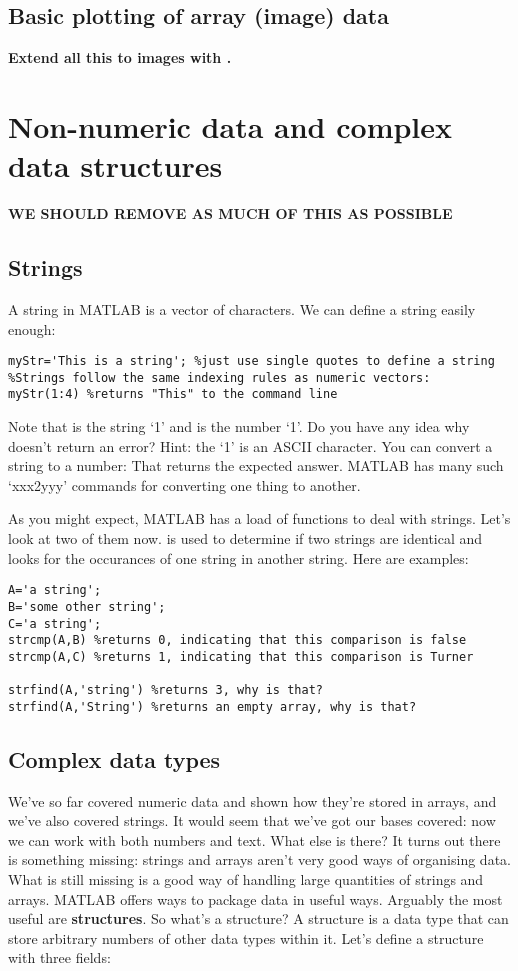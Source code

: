 \documentclass{article}
\begin{document}
\pagebreak
\subsection*{Basic plotting of array (image) data}
\textbf{Extend all this to images with .}



\pagebreak
\section*{Non-numeric data and complex data structures} 
\textbf{WE SHOULD REMOVE AS MUCH OF THIS AS POSSIBLE}

\subsection*{Strings}
A string in MATLAB is a vector of characters. We can define a string easily enough: 
\begin{lstlisting}
myStr='This is a string'; %just use single quotes to define a string
%Strings follow the same indexing rules as numeric vectors:
myStr(1:4) %returns "This" to the command line
\end{lstlisting}

Note that  is the string `1' and  is the number `1'. Do you have any idea why  doesn't return an error? Hint: the `1' is an ASCII character. You can convert a string to a number:  That returns the expected answer. MATLAB has many such `xxx2yyy' commands for converting one thing to another. 

As you might expect, MATLAB has a load of functions to deal with strings. Let's look at two of them now.  is used to determine if two strings are identical and  looks for the occurances of one string in another string. Here are examples:

\begin{lstlisting}
A='a string';
B='some other string';
C='a string';
strcmp(A,B) %returns 0, indicating that this comparison is false
strcmp(A,C) %returns 1, indicating that this comparison is Turner

strfind(A,'string') %returns 3, why is that?
strfind(A,'String') %returns an empty array, why is that?
\end{lstlisting}


\subsection*{Complex data types}
We've so far covered numeric data and shown how they're stored in arrays, and we've also covered strings. It would seem that we've got our bases covered: now we can work with both numbers and text. What else is there? It turns out there is something missing: strings and arrays aren't very good ways of organising data. What is still missing is a good way of handling large quantities of strings and arrays. MATLAB offers ways to package data in useful ways. Arguably the most useful are \textbf{structures}. So what's a structure? A structure is a data type that can store arbitrary numbers of other data types within it. Let's define a structure with three fields:
\end{document}
